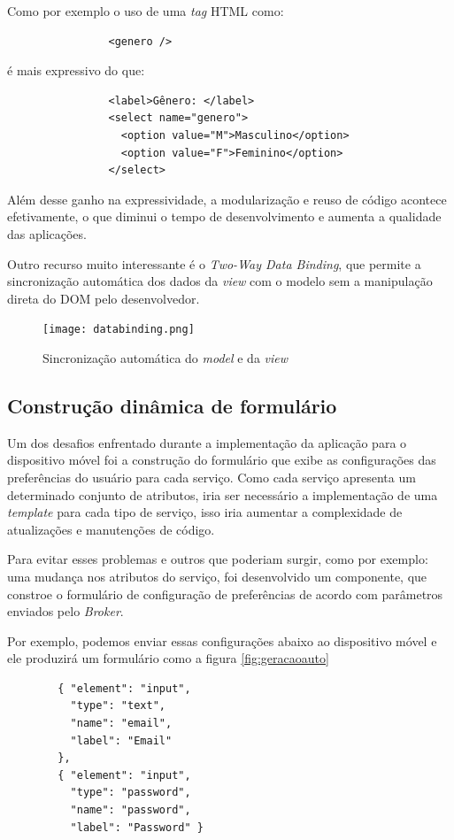 Como por exemplo o uso de uma \textit{tag} HTML como: 
\begin{verbatim}
                <genero />
\end{verbatim}

é mais expressivo do que:
\begin{verbatim}
                <label>Gênero: </label>
                <select name="genero">
                  <option value="M">Masculino</option>
                  <option value="F">Feminino</option>
                </select>
\end{verbatim}

Além desse ganho na expressividade, a modularização e reuso de código acontece efetivamente, o que diminui o tempo de desenvolvimento e aumenta a qualidade das aplicações.

Outro recurso muito interessante é o \textit{Two-Way Data Binding}, que permite a sincronização automática dos dados da \textit{view} com o modelo sem a manipulação direta do DOM pelo desenvolvedor.

\begin{figure}[!htb]
  \centering
  \texttt{[image: databinding.png]} %
  \caption[Sincronização automática do \textit{model} e da \textit{view}]{Sincronização automática do \textit{model} e da \textit{view}}
  \label{fig:twoway}
\end{figure}

\subsection{Construção dinâmica de formulário}
Um dos desafios enfrentado durante a implementação da aplicação para o dispositivo móvel foi a construção do formulário que exibe as configurações das preferências do usuário para cada serviço. Como cada serviço apresenta um determinado conjunto de atributos, iria ser necessário a implementação de uma \textit{template} para cada tipo de serviço, isso iria aumentar a complexidade de atualizações e manutenções de código.

Para evitar esses problemas e outros que poderiam surgir, como por exemplo: uma mudança nos atributos do serviço, foi desenvolvido um componente, que constroe o formulário de configuração de preferências de acordo com parâmetros enviados pelo \textit{Broker}.

Por exemplo, podemos enviar essas configurações abaixo ao dispositivo móvel e ele produzirá um formulário como a figura \ref{fig:geracaoauto}
\begin{verbatim}
        { "element": "input",
          "type": "text",
          "name": "email",
          "label": "Email"
        },
        { "element": "input",
          "type": "password",
          "name": "password",
          "label": "Password" }
\end{verbatim}

